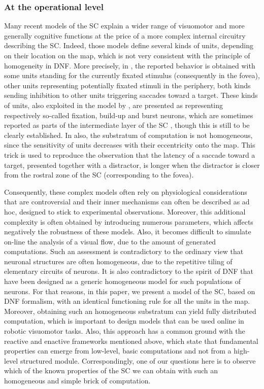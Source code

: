 \subsubsection{At the operational level}

Many recent models of the SC explain a wider range of visuomotor and more
generally cognitive functions at the price of a more complex internal circuitry
describing the SC. Indeed, those models define several kinds of units,
depending on their location on the map, which is not very consistent with the
principle of homogeneity in DNF. More precisely, in \cite{Trappenberg:2001},
the reported behavior is obtained with some units standing for the currently
fixated stimulus (consequently in the fovea), other units representing
potentially fixated stimuli in the periphery, both kinds sending inhibition to
other units triggering saccades toward a target. These kinds of units, also
exploited in the model by \cite{Schneider:2002}, are presented as representing
respectively so-called fixation, build-up and burst neurons, which are
sometimes reported as parts of the intermediate layer of the SC
\cite{Wurtz:1994}, though this is still to be clearly established. In
\cite{Godijn:2002} also, the substratum of computation is not homogeneous,
since the sensitivity of units decreases with their eccentricity onto the
map. This trick is used to reproduce the observation that the latency of a
saccade toward a target, presented together with a distractor, is longer when
the distractor is closer from the rostral zone of the SC (corresponding to the
fovea).

Consequently, these complex models often rely on physiological considerations
that are controversial and their inner mechanisms can often be described as ad
hoc, designed to stick to experimental observations. Moreover, this additional
complexity is often obtained by introducing numerous parameters, which affects negatively the
robustness of these models. Also, it becomes difficult to simulate
on-line the analysis of a visual flow, due to the amount of generated
computations. Such an assessment is contradictory to the ordinary view that
neuronal structures are often homogeneous, due to the repetitive tiling of
elementary circuits of neurons. It is also contradictory to the spirit of DNF
that have been designed as a generic homogeneous model for such populations of
neurons.  For that reasons, in this paper, we present a model of the SC, based
on DNF formalism, with an identical functioning rule for all the units in the
map. Moreover, obtaining such an homogeneous substratum can yield fully
distributed computation, which is important to design models that can be used
online in robotic visuomotor tasks. Also, this approach has a common ground
with the reactive and enactive frameworks mentioned above, which state that
fundamental properties can emerge from low-level, basic computations and not
from a high-level structured module. Correspondingly, one of our questions here
is to observe which of the known properties of the SC we can obtain with such
an homogeneous and simple brick of computation.

